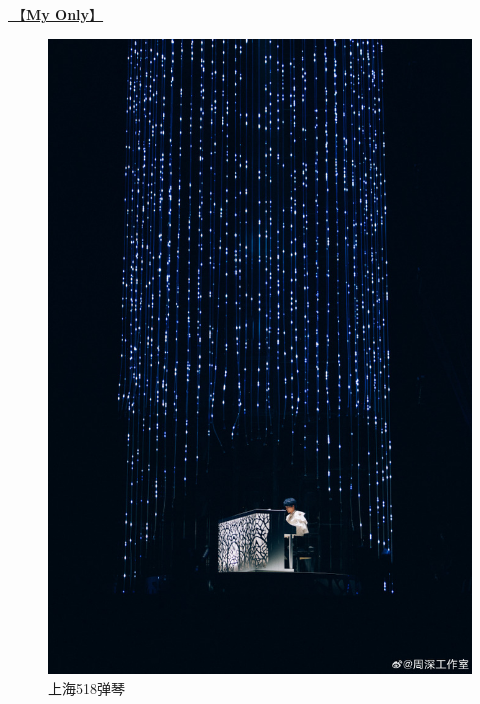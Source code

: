 \documentclass[]{ctexbook}
\begin{document}
\hyperref[my-only]{🎵【\textbf{My Only}】}

\begin{figure}

{\centering \includegraphics[width=400pt]{img/shanghai20240518/001} 

}

\caption{上海518弹琴}\label{fig:unnamed-chunk-33}
\end{figure}
\end{document}
